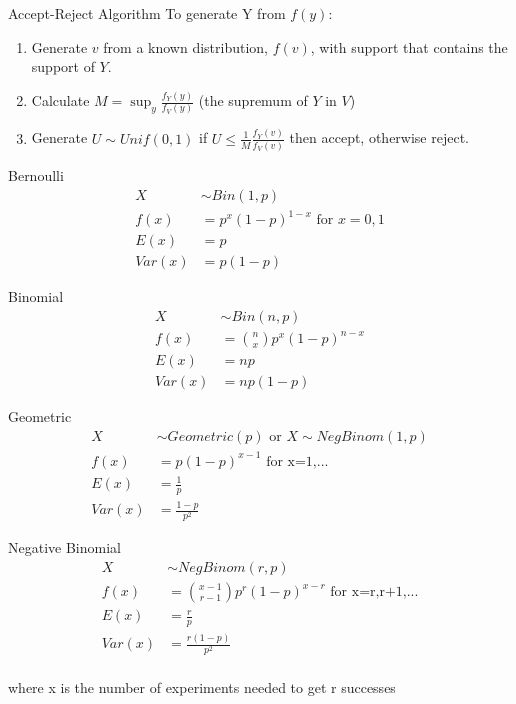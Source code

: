 \documentclass[avery5388,grid,frame]{flashcards}
\begin{document}
\begin{flashcard}[Definition]{Accept-Reject Algorithm}
\bigskip\bigskip\bigskip
To generate Y from $f(y)$:
\begin{enumerate}
\item Generate $v$ from a known distribution, $f(v)$, with support that contains the support of $Y$.
\item Calculate $M=\sup_y\frac{f_Y(y)}{f_V(y)}$ (the supremum of $Y$ in $V$)
\item Generate $U\sim Unif(0,1)$ if $U\leq\frac{1}{M}\frac{f_Y(v)}{f_V(v)}$ then accept, otherwise reject.
\end{enumerate}
\end{flashcard}
\begin{flashcard}[Distribution]{Bernoulli}
\bigskip\bigskip\bigskip
{\begin{align*}
X&\sim Bin(1,p)\\
f(x)&=p^x(1-p)^{1-x}\textrm{  for } x=0,1\\
E(x)&=p\\
Var(x)&=p(1-p)
\end{align*}}
\end{flashcard}
\begin{flashcard}[Distribution]{Binomial}
\bigskip\bigskip\bigskip
{\begin{align*}
X&\sim Bin(n,p)\\
f(x)&={n\choose x}p^x(1-p)^{n-x}\\
E(x)&=np\\
Var(x)&=np(1-p)
\end{align*}}
\end{flashcard}
\begin{flashcard}[Distribution]{Geometric}
\bigskip\bigskip\bigskip
{\begin{align*}
X&\sim Geometric(p) \textrm{ or } X\sim NegBinom(1,p)\\
f(x)&=p(1-p)^{x-1}\textrm{  for x=1,...}\\
E(x)&=\frac{1}{p}\\
Var(x)&=\frac{1-p}{p^2}
\end{align*}}
\end{flashcard}
\begin{flashcard}[Distribution]{Negative Binomial}
\bigskip\bigskip\bigskip
{\begin{align*}
X&\sim NegBinom(r,p)\\
f(x)&={x-1\choose r-1}p^r(1-p)^{x-r} \textrm{  for x=r,r+1,...}\\
E(x)&=\frac{r}{p}\\
Var(x)&=\frac{r(1-p)}{p^2}
\end{align*}}
\bigskip\\
where x is the number of experiments needed to get r successes
\end{flashcard}
\end{document}
